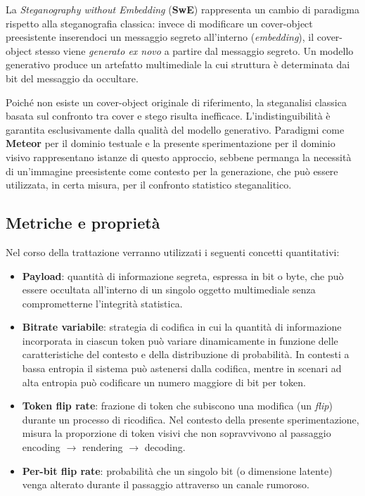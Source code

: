 La \emph{Steganography without Embedding} (\textbf{SwE}) rappresenta un cambio di paradigma rispetto alla steganografia classica: invece di modificare un cover-object preesistente inserendoci un messaggio segreto all'interno (\emph{embedding}), il cover-object stesso viene \emph{generato ex novo} a partire dal messaggio segreto. Un modello generativo produce un artefatto multimediale la cui struttura è determinata dai bit del messaggio da occultare.

Poiché non esiste un cover-object originale di riferimento, la steganalisi classica basata sul confronto tra cover e stego risulta inefficace. L'indistinguibilità è garantita esclusivamente dalla qualità del modello generativo. Paradigmi come \textbf{Meteor} per il dominio testuale e la presente sperimentazione per il dominio visivo rappresentano istanze di questo approccio, sebbene permanga la necessità di un'immagine preesistente come contesto per la generazione, che può essere utilizzata, in certa misura, per il confronto statistico steganalitico.

\subsection{Metriche e proprietà}

Nel corso della trattazione verranno utilizzati i seguenti concetti quantitativi:

\begin{itemize}
	\item \textbf{Payload}: quantità di informazione segreta, espressa in bit o byte, che può essere occultata all'interno di un singolo oggetto multimediale senza comprometterne l'integrità statistica.
	\item \textbf{Bitrate variabile}: strategia di codifica in cui la quantità di informazione incorporata in ciascun token può variare dinamicamente in funzione delle caratteristiche del contesto e della distribuzione di probabilità. In contesti a bassa entropia il sistema può astenersi dalla codifica, mentre in scenari ad alta entropia può codificare un numero maggiore di bit per token.
	\item \textbf{Token flip rate}: frazione di token che subiscono una modifica (un \emph{flip}) durante un processo di ricodifica. Nel contesto della presente sperimentazione, misura la proporzione di token visivi che non sopravvivono al passaggio encoding $\to$ rendering $\to$ decoding.
	\item \textbf{Per-bit flip rate}: probabilità che un singolo bit (o dimensione latente) venga alterato durante il passaggio attraverso un canale rumoroso.
\end{itemize}

